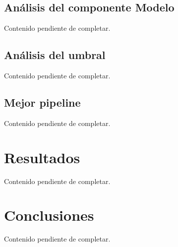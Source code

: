 \documentclass[12pt]{article}
\begin{document}
\subsection{Análisis del componente Modelo}
Contenido pendiente de completar.

\subsection{Análisis del umbral}
Contenido pendiente de completar.

\subsection{Mejor pipeline}
Contenido pendiente de completar.

\section{Resultados}
Contenido pendiente de completar.

\section{Conclusiones}
Contenido pendiente de completar.

\clearpage


\end{document}

